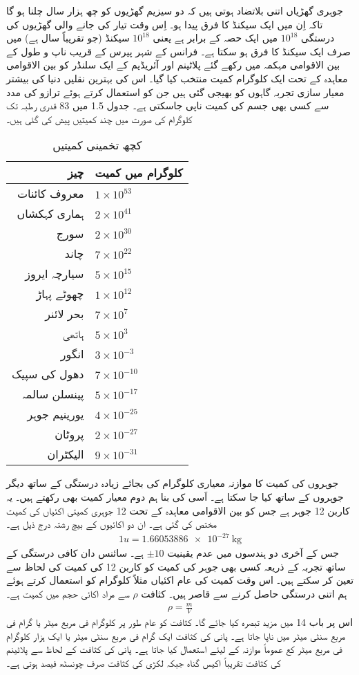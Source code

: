 جوہری گھڑیاں اتنی بلاتضاد ہوتی ہیں کہ دو سیزیم گھڑیوں کو چھ ہزار سال چلنا ہو گا تاکہ اِن میں ایک سیکنڈ کا فرق پیدا ہو۔ اِس وقت تیار کی جانے والی گھڑیوں کی درستگی $10^{18}$ میں ایک حصہ کے برابر ہے یعنی $10^{18}$ سیکنڈ (جو تقریباً  سال ہے)  میں صرف ایک سیکنڈ کا فرق ہو سکتا ہے۔
فرانس کے شہر پیرس کے قریب ناپ و طول کے بین الاقوامی مہکمہ میں رکھے گئے پلاٹینم اور آئریڈیم کے ایک سلنڈر کو بین الاقوامی معاہدہ کے تحت ایک کلوگرام کمیت منتخب کیا گیا۔ اس کی بہترین نقلیں دنیا کی بیشتر معیار سازی تجربہ گاہوں کو بھیجی گئی ہیں جن کو استعمال کرتے ہوئے ترازو کی مدد سے کسی بھی جسم کی کمیت ناپی جاسکتی ہے۔ جدول 1.5 میں 83 قدری رطبہ تک کلوگرام کی صورت میں  چند کمیتیں پیش کی گئی ہیں۔
\begin{table}[h!]
	\centering
	\begin{tabular}{rl}
\toprule
چیز & کلوگرام میں کمیت\\
\midrule
معروف کائنات & $1\times 10^{53}$\\
ہماری کہکشاں & $2\times 10^{41}$\\
سورج & $2\times 10^{30}$\\
چاند & $7\times 10^{22}$\\
سیارچہ ایروز & $5\times 10^{15}$\\
چھوٹے پہاڑ & $1\times 10^{12}$\\
بحر لائنر & $7\times10^{7}$\\
ہاتھی & $5\times10^{3}$\\
انگور & $3\times10^{-3}$\\
دھول کی سپیک & $7\times10^{-10}$\\
پینسلن سالمہ & $5\times10^{-17}$\\
یورینیم جوہر & $4\times10^{-25}$\\
 پروٹان & $2\times10^{-27}$\\
 الیکٹران & $9\times10^{-31}$\\
 \bottomrule
	\end{tabular}
\caption{کچھ تخمینی کمیتیں}
\label{tab:my_label}
\end{table}
جوہروں کی کمیت کا موازنہ معیاری کلوگرام کی بجائے زیادہ درستگی کے ساتھ دیگر جوہروں کے ساتھ کیا جا سکتا ہے۔ اَسی کی بنا ہم دوم معیار کمیت بھی رکھتے ہیں۔ یہ کاربن 12 جوہر ہے جس کو بین الاقوامی معاہدہ کے تحت 12 جوہری کمیتی اکئیاں کی کمیت مختص کی گئی ہے۔ ان دو اکائیوں کے بیچ رشتہ درج ذیل ہے۔
\begin{align}
	\num{1} u = \SI{1.66053886e-27}{\kilogram}
\end{align}
جس کے آخری دو ہندسوں میں عدم یقینیت $\pm 10$ ہے۔ سائنس دان کافی درستگی کے ساتھ تجربہ کے ذریعہ کسی بھی جوہر کی کمیت کو کاربن 12 کی کمیت کی لحاظ سے تعین کر سکتے ہیں۔ اس وقت کمیت کی عام اکئیاں مثلاً کلوگرام کو استعمال کرتے ہوئے ہم اتنی درستگی حاصل کرنے سے قاصر ہیں۔
کثافت $\rho$ سے مراد  اکائی حجم میں کمیت ہے۔
\begin{align}
	\rho = \frac{m}{V}
\end{align}
اس پر باب 14 میں مزید تبصرہ کیا جائے گا۔ کثافت کو عام طور پر کلوگرام فی مربع میٹر یا گرام فی مربع سنٹی میٹر میں ناپا جاتا ہے۔ پانی کی کثافت ایک گرام فی مربع سنٹی میٹر یا ایک ہزار کلوگرام فی مربع میٹر کع عموماً موازنہ کے لیئے استعمال کیا جاتا ہے۔ پانی کی کثافت کے لحاظ سے پلاٹینم کی کثافت تقریباً اکیس گناہ جبکہ لکڑی کی کثافت صرف چونسٹھ فیصد ہوتی ہے۔
